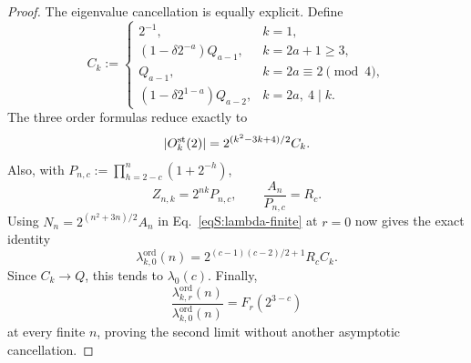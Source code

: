 \documentclass[journal,twocolumn]{IEEEtran}
\theoremstyle{definition}
\theoremstyle{plain}
\newcommand{\Ord}{\mathrm{ord}}
\begin{document}
\begin{proof}
The eigenvalue cancellation is equally explicit.  Define
\begin{equation}
 C_k:=
 \begin{cases}
 2^{-1},&k=1,\\
 (1-\delta2^{-a})Q_{a-1},&k=2a+1\geq3,\\
 Q_{a-1},&k=2a\equiv2\pmod4,\\
 (1-\delta2^{1-a})Q_{a-2},&k=2a,\ 4\mid k.
 \end{cases}
 \label{eqS:Ck}
\end{equation}
The three order formulas reduce exactly to
\begin{equation}
 |O_k^{\rm st}(2)|=2^{(k^2-3k+4)/2}C_k.
 \label{eqS:order-cancellation}
\end{equation}
Also, with
$P_{n,c}:=\prod_{h=2-c}^{n}(1+2^{-h})$,
\begin{equation}
 Z_{n,k}=2^{nk}P_{n,c},\qquad \frac{A_n}{P_{n,c}}=R_c.
 \label{eqS:Z-fixed-offset-product}
\end{equation}
Using $N_n=2^{(n^2+3n)/2}A_n$ in
Eq.~\eqref{eqS:lambda-finite} at $r=0$ now gives the exact identity
\begin{equation}
 \lambda^{\Ord}_{k,0}(n)
 =2^{(c-1)(c-2)/2+1}R_cC_k.
 \label{eqS:lambda0-finite-cancellation}
\end{equation}
Since $C_k\to Q$, this tends to $\lambda_0(c)$.  Finally,
\begin{equation}
 \frac{\lambda^{\Ord}_{k,r}(n)}{\lambda^{\Ord}_{k,0}(n)}
 =F_r(2^{3-c})
 \label{eqS:eigenvalue-exact-ratio}
\end{equation}
at every finite $n$, proving the second limit without another asymptotic
cancellation.


\end{proof}
\end{document}
